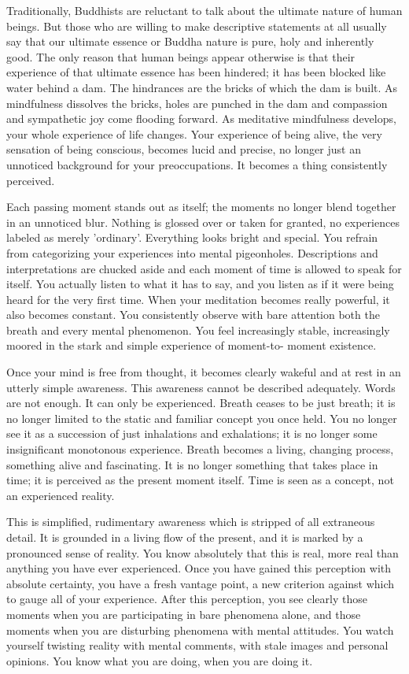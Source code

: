 Traditionally, Buddhists are reluctant to talk about the ultimate nature of
human beings. But those who are willing to make descriptive statements at all
usually say that our ultimate essence or Buddha nature is pure, holy and
inherently good. The only reason that human beings appear otherwise is that
their experience of that ultimate essence has been hindered; it has been blocked
like water behind a dam. The hindrances are the bricks of which the dam is
built. As mindfulness dissolves the bricks, holes are punched in the dam and
compassion and sympathetic joy come flooding forward. As meditative mindfulness
develops, your whole experience of life changes. Your experience of being alive,
the very sensation of being conscious, becomes lucid and precise, no longer just
an unnoticed background for your preoccupations. It becomes a thing consistently
perceived.

Each passing moment stands out as itself; the moments no longer blend together
in an unnoticed blur. Nothing is glossed over or taken for granted, no
experiences labeled as merely 'ordinary'. Everything looks bright and special.
You refrain from categorizing your experiences into mental pigeonholes.
Descriptions and interpretations are chucked aside and each moment of time is
allowed to speak for itself. You actually listen to what it has to say, and you
listen as if it were being heard for the very first time. When your meditation
becomes really powerful, it also becomes constant. You consistently observe with
bare attention both the breath and every mental phenomenon. You feel
increasingly stable, increasingly moored in the stark and simple experience of
moment-to- moment existence.

Once your mind is free from thought, it becomes clearly wakeful and at rest in
an utterly simple awareness. This awareness cannot be described adequately.
Words are not enough. It can only be experienced. Breath ceases to be just
breath; it is no longer limited to the static and familiar concept you once
held. You no longer see it as a succession of just inhalations and exhalations;
it is no longer some insignificant monotonous experience. Breath becomes a
living, changing process, something alive and fascinating. It is no longer
something that takes place in time; it is perceived as the present moment
itself. Time is seen as a concept, not an experienced reality.

This is simplified, rudimentary awareness which is stripped of all extraneous
detail. It is grounded in a living flow of the present, and it is marked by a
pronounced sense of reality. You know absolutely that this is real, more real
than anything you have ever experienced. Once you have gained this perception
with absolute certainty, you have a fresh vantage point, a new criterion against
which to gauge all of your experience. After this perception, you see clearly
those moments when you are participating in bare phenomena alone, and those
moments when you are disturbing phenomena with mental attitudes. You watch
yourself twisting reality with mental comments, with stale images and personal
opinions. You know what you are doing, when you are doing it.

